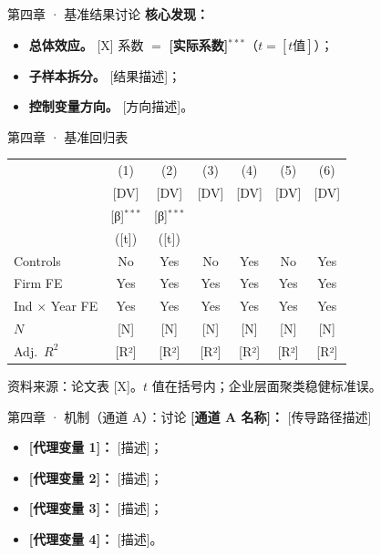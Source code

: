\documentclass[10pt,aspectratio=169]{beamer}
\begin{document}

\begin{frame}{第四章 · 基准结果讨论}
  \textbf{核心发现：}
  \begin{itemize}
    \item \textbf{总体效应。} [X] 系数 $=$ \textbf{[实际系数]$^{***}$}（$t=[t 值]$）；
    \item \textbf{子样本拆分。} [结果描述]；
    \item \textbf{控制变量方向。} [方向描述]。
  \end{itemize}
\end{frame}

\begin{frame}{第四章 · 基准回归表}
\centering\scriptsize
\setlength{\tabcolsep}{3.5pt}
\begin{tabular}{lcccccc}
  \toprule
           & (1) & (2) & (3) & (4) & (5) & (6) \\
           & [DV]& [DV]& [DV]& [DV]& [DV]& [DV]\\
  \midrule
  [X]      & [β]$^{***}$ & [β]$^{***}$ & & & & \\
           & ([t])       & ([t])       & & & & \\
  \midrule
  Controls            & No  & Yes & No  & Yes & No  & Yes \\
  Firm FE             & Yes & Yes & Yes & Yes & Yes & Yes \\
  Ind $\times$ Year FE& Yes & Yes & Yes & Yes & Yes & Yes \\
  $N$                 & [N] & [N] & [N] & [N] & [N] & [N] \\
  Adj.\ $R^{2}$       & [R²]& [R²]& [R²]& [R²]& [R²]& [R²]\\
  \bottomrule
\end{tabular}

\vspace{0.4em}
\footnotesize 资料来源：论文表 [X]。$t$ 值在括号内；企业层面聚类稳健标准误。
\end{frame}


\begin{frame}{第四章 · 机制（通道 A）：讨论}
  \textbf{[通道 A 名称]：} [传导路径描述]

  \vspace{0.3em}
  \begin{itemize}
    \item \textbf{[代理变量 1]：} [描述]；
    \item \textbf{[代理变量 2]：} [描述]；
    \item \textbf{[代理变量 3]：} [描述]；
    \item \textbf{[代理变量 4]：} [描述]。
  \end{itemize}
\end{frame}
\end{document}

